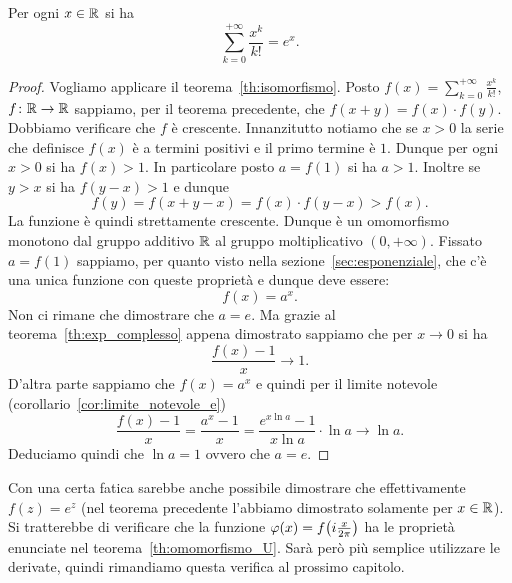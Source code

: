 \begin{theorem}%
\label{th:exp=ex}%
\label{th:serie_esponenziale}%
%
\mymark{***}%
Per ogni $x\in {\mathbb R}$ si ha
\[
  \sum_{k=0}^{+\infty} \frac{x^k}{k!} = e^x.
\]
\end{theorem}
%
\begin{proof}\mymark{**}
Vogliamo applicare il teorema~\ref{th:isomorfismo}.
Posto $f(x)=\sum_{k=0}^{+\infty} \frac{x^k}{k!}$, 
$f\colon {\mathbb R}\to{\mathbb R}$ sappiamo,
per il teorema precedente, che $f(x+y)=f(x)\cdot f(y)$.
Dobbiamo verificare che $f$ è crescente.
Innanzitutto notiamo che se $x> 0$ la serie che definisce
$f(x)$ è a termini positivi e il primo termine è $1$.
Dunque per ogni $x> 0$ si ha $f(x)>1$.
In particolare posto $a=f(1)$ si ha $a>1$.
Inoltre se $y>x$ si ha $f(y-x)>1$ e dunque
\[
 f(y) = f(x+y-x) = f(x)\cdot f(y-x) > f(x).
\]
La funzione è quindi strettamente crescente. 
Dunque è un omomorfismo monotono dal gruppo additivo ${\mathbb R}$ al 
gruppo moltiplicativo $(0,+\infty)$.
Fissato $a=f(1)$ sappiamo,
per quanto visto nella sezione~\ref{sec:esponenziale},
che c'è una unica funzione con queste proprietà e dunque 
deve essere: 
\[
  f(x)= a^x.
\]
Non ci rimane che dimostrare che $a=e$.
Ma grazie al teorema~\ref{th:exp_complesso}
appena dimostrato sappiamo che per $x\to 0$ si ha
\[
  \frac{f(x)-1}{x}\to 1.
\]
D'altra parte sappiamo che $f(x)=a^x$ e quindi
per il limite notevole (corollario~\ref{cor:limite_notevole_e})
\[
\frac{f(x)-1}{x} = \frac{a^{x}-1}{x}
= \frac{e^{x \ln a}-1}{x \ln a} \cdot \ln a
\to \ln a.
\]
Deduciamo quindi che $\ln a= 1$ ovvero che $a=e$.
\end{proof}

Con una certa fatica sarebbe anche possibile dimostrare che 
effettivamente $f(z)=e^z$ (nel teorema precedente l'abbiamo dimostrato 
solamente per $x\in {\mathbb R}$). 
Si tratterebbe di verificare che la funzione 
$\varphi(x) = f{\left( i\frac{x}{2\pi} \right)}$
ha le proprietà enunciate nel teorema~\ref{th:omomorfismo_U}.
Sarà però più semplice utilizzare le derivate, quindi rimandiamo questa 
verifica al prossimo capitolo.

% 

